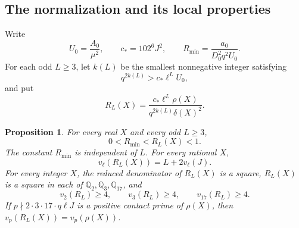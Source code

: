 \documentclass[11pt]{article}
\newtheorem{proposition}[theorem]{Proposition}
\theoremstyle{remark}\newtheorem{remark}[theorem]{Remark}
\newcommand{\Q}{\mathbb Q}\newcommand{\Z}{\mathbb Z}
\begin{document}
\subsection{The normalization and its local properties}

Write
\[
 U_0=\frac{A_0}{\mu^2},\qquad
 c_*=102^6J^2,\qquad
 R_{\min}=\frac{a_0}{D_0^2q^2U_0}.
\]
For each odd $L\ge3$, let $k(L)$ be the smallest nonnegative
integer satisfying
\[
                  q^{2k(L)}>c_*\ell^L U_0,
\]
and put
\begin{equation}\label{eq:normalizer}
 R_L(X)=\frac{c_*\ell^L\rho(X)}{q^{2k(L)}\delta(X)^2}.
\end{equation}

\begin{proposition}\label{prop:normalizer}
For every real $X$ and every odd $L\ge3$,
\[
                    0<R_{\min}<R_L(X)<1.
\]
The constant $R_{\min}$ is independent of $L$.  For every rational $X$,
\begin{equation}\label{eq:ell-depth}
                   v_\ell(R_L(X))=L+2v_\ell(J).
\end{equation}
For every integer $X$, the reduced denominator of $R_L(X)$ is a
square, $R_L(X)$ is a square in each of $\Q_2,\Q_3,\Q_{17}$, and
\[
 v_2(R_L)\ge4,\qquad v_3(R_L)\ge4,\qquad v_{17}(R_L)\ge4.
\]
If $p\nmid 2\cdot3\cdot17\cdot q\ell J$ is a positive contact
prime of $\rho(X)$, then $v_p(R_L(X))=v_p(\rho(X))$.
\end{proposition}
\end{document}
